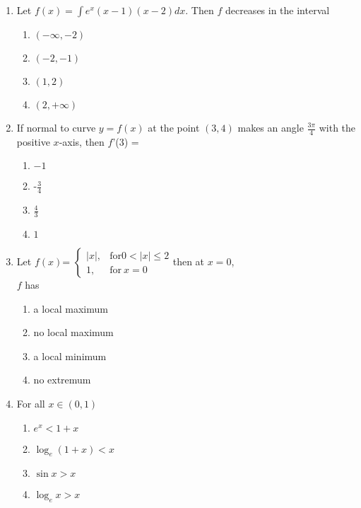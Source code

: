 \documentclass[journal]{IEEEtran}
\begin{document}
\begin{enumerate}[start=9]
\item Let $f(x)=\int e^x(x-1)(x-2)dx$. Then $f$ decreases in the interval 
\hfill {}
\begin{multicols}{3}
\begin{enumerate}
    \item $(-\infty,-2)$
    \item $(-2,-1)$
    \item $(1,2)$
    \item $(2,+\infty)$\\
\end{enumerate}
\end{multicols}
\item If normal to curve $y=f(x)$ at the point $(3,4)$ makes an angle $\displaystyle\frac{3\pi}{4}$ with the positive $x$-axis, then $f$'(3) = \hfill{}
\begin{multicols}{2}
\begin{enumerate}
    \item $-1$
    \item -$\displaystyle\frac{3}{4}$\\
    \item $\displaystyle\frac{4}{3}$
    \item $1$
\end{enumerate}
\end{multicols}
\item Let $f(x)$=
$\begin{cases}
|x|, & \text{for}  0<|x| \leq 2\\ 
1, & \text{for}\  x=0
\end{cases}$then at $x=0$, \\$f$ has
\hfill {}
\begin{enumerate}
    \item a local maximum
    \item no local maximum
    \item a local minimum
    \item no extremum\\
\end{enumerate}
\item For all $x\in(0,1)$
\hfill {}
\begin{enumerate}
    \item $e^{x} <1+x$
    \item $\log_e{(1+x)} < x$
    \item $ \sin{x} > x$
    \item $ \log_e{x} > x $\\

\end{enumerate}
\end{enumerate}
\end{document}
